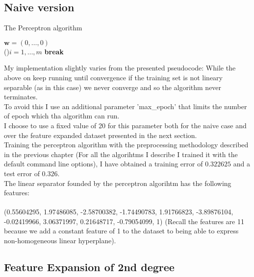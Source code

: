 \subsection{Naive version}
\begin{algorithm}[H]
    \SetAlgoLined
    \DontPrintSemicolon
    \caption{The Perceptron algorithm}
    $\boldsymbol{w} = (0, \dots, 0)$\\
 {  
    \For(){$i = 1, \dots, m$}{
    }
     {
        \textbf{break}
    } 
   }
\end{algorithm}

My implementation slightly varies from the presented pseudocode:
While the above on keep running until convergence if the training set is not lineary separable (as in this case) we never converge and so the algorithm never terminates.\\
To avoid this I use an additional parameter 'max\_epoch' that limits the number of epoch which tha algorithm can run.\\
I choose to use a fixed value of 20 for this parameter both for the naive case and over the feature expanded dataset presented in the next section.\\
Training the perceptron algorithm with the preprocessing methodology described in the previous chapter (For all the algorihtms I describe I trained it with the default command line options), I have obtained a training error of $0.322625$ and a test error of $0.326$.\\
The linear separator founded by the perceptron algorihtm has the following features:\\\\
(0.55604295,  1.97486085, -2.58700382, -1.74490783,  1.91766823, -3.89876104,\\
 -0.02419966,  3.06371997,  0.21648717, -0.79054099,  1)
(Recall the features are 11 because we add a constant feature of 1 to the dataset to being able to express non-homogeneous linear hyperplane).\\

\subsection{Feature Expansion of 2nd degree}

